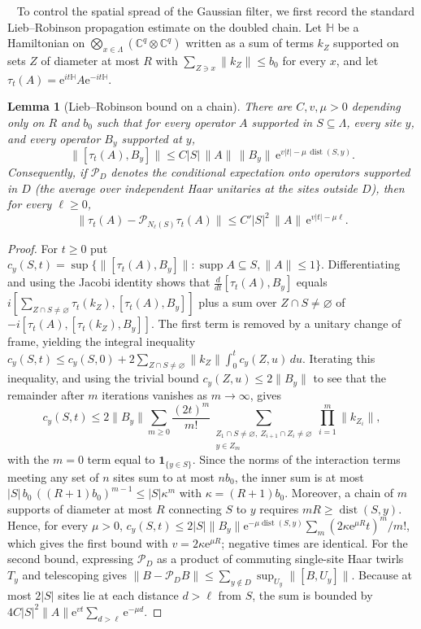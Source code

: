 \documentclass[aps,prx,reprint,superscriptaddress,floatfix,nofootinbib,longbibliography,amsmath,amssymb]{revtex4-2}
\newcommand{\C}{\mathbb C}
\newcommand{\dist}{\operatorname{dist}}
\newcommand{\supp}{\operatorname{supp}}
\newcommand{\norm}[1]{\lVert #1\rVert}
\newcommand{\abs}[1]{\lvert #1\rvert}
\newcommand{\Lam}{\Lambda}
\newcommand{\e}{\mathrm e}
\theoremstyle{plain}
\newtheorem{lemma}[theorem]{Lemma}
\theoremstyle{definition}
\newcommand{\precisely}{\par\noindent{\bfseries Precisely.}\ }
\begin{document}
\precisely
To control the spatial spread of the Gaussian filter, we first record the standard
Lieb--Robinson propagation estimate on the doubled chain. Let
$\mathbb H$ be a Hamiltonian on $\bigotimes_{x\in\Lam}(\C^q\otimes\C^q)$
written as a sum of terms $k_Z$ supported on sets $Z$ of diameter at most
$R$ with $\sum_{Z\ni x}\norm{k_Z}\le b_0$ for every $x$, and let
$\tau_t(A)=\e^{it\mathbb H}A\e^{-it\mathbb H}$.

\begin{lemma}[Lieb--Robinson bound on a chain]\label{lem:LR}
There are $C,v,\mu>0$ depending only on $R$ and $b_0$ such that for every
operator $A$ supported in $S\subseteq\Lam$, every site $y$, and every
operator $B_y$ supported at $y$,
\[
 \norm{[\tau_t(A),B_y]}\le C\abs S\,\norm A\,\norm{B_y}\,\e^{v\abs t-\mu\,\dist(S,y)} .
\]
Consequently, if $\mathcal P_D$ denotes the conditional expectation onto
operators supported in $D$ (the average over independent Haar unitaries at
the sites outside $D$), then for every $\ell\ge0$,
\[
 \norm{\tau_t(A)-\mathcal P_{N_\ell(S)}\tau_t(A)}\le C'\abs S^2\,\norm A\,\e^{v\abs t-\mu\ell}.
\]
\end{lemma}
\begin{proof}
For $t\ge0$ put $c_y(S,t)=\sup\{\norm{[\tau_t(A),B_y]}:\supp A\subseteq S,\norm A\le1\}$.
Differentiating and using the Jacobi identity shows that $\frac{d}{dt}[\tau_t(A),B_y]$
equals $i[\sum_{Z\cap S\ne\varnothing}\tau_t(k_Z),[\tau_t(A),B_y]]$
plus a sum over $Z\cap S\ne\varnothing$ of $-i[\tau_t(A),[\tau_t(k_Z),B_y]]$. The
first term is removed by a unitary change of frame, yielding the integral inequality
$c_y(S,t)\le c_y(S,0)+2\sum_{Z\cap S\ne\varnothing}\norm{k_Z}\int_0^tc_y(Z,u)\,du$.
Iterating this inequality, and using the trivial bound $c_y(Z,u)\le2\norm{B_y}$ to see
that the remainder after $m$ iterations vanishes as $m\to\infty$, gives
\[
 c_y(S,t)\le 2\norm{B_y}\sum_{m\ge0}\frac{(2t)^m}{m!}
 \sum_{\substack{Z_1\cap S\ne\varnothing,\ Z_{i+1}\cap Z_i\ne\varnothing\\ y\in Z_m}}
 \prod_{i=1}^m\norm{k_{Z_i}},
\]
with the $m=0$ term equal to $\mathbf 1_{\{y\in S\}}$. Since the norms of
the interaction terms meeting any set of $n$ sites sum to at most $nb_0$, the inner
sum is at most $\abs S\,b_0\,((R+1)b_0)^{m-1}\le\abs S\kappa^m$ with
$\kappa=(R+1)b_0$. Moreover, a chain of $m$ supports of diameter at most $R$
connecting $S$ to $y$ requires $mR\ge\dist(S,y)$. Hence,
for every $\mu>0$,
$c_y(S,t)\le 2\abs S\norm{B_y}\e^{-\mu\dist(S,y)}\sum_m(2\kappa\e^{\mu R}t)^m/m!$,
which gives the first bound with $v=2\kappa\e^{\mu R}$; negative times are
identical. For the second
bound, expressing $\mathcal P_D$ as a product of commuting single-site Haar twirls
$T_y$ and telescoping gives
$\norm{B-\mathcal P_DB}\le\sum_{y\notin D}\sup_{U_y}\norm{[B,U_y]}$. Because at most
$2\abs S$ sites lie at each distance $d>\ell$ from $S$, the sum is bounded by
$4C\abs S^2\norm A\e^{vt}\sum_{d>\ell}\e^{-\mu d}$.
\end{proof}
\end{document}
